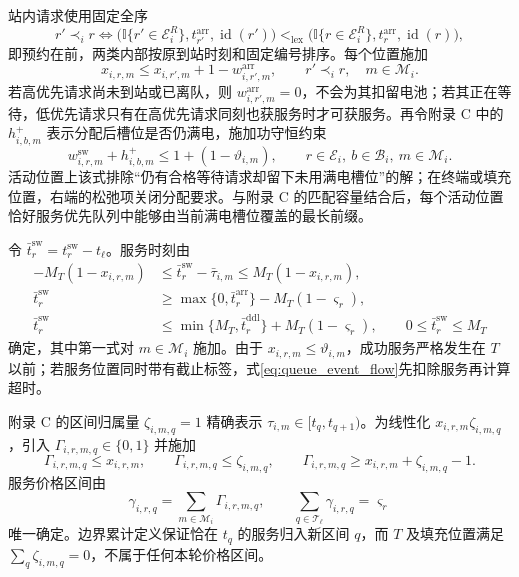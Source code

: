 \documentclass[12pt,a4paper,UTF8]{ctexart}
\begin{document}
站内请求使用固定全序
\begin{equation}
r'\prec_i r
\Longleftrightarrow
\bigl(\mathbb I\{r'\in\mathcal E_i^R\},
t_{r'}^{\mathrm{arr}},\operatorname{id}(r')\bigr)
<_{\mathrm{lex}}
\bigl(\mathbb I\{r\in\mathcal E_i^R\},
t_r^{\mathrm{arr}},\operatorname{id}(r)\bigr),
\label{eq:reservation_priority}
\end{equation}
即预约在前，两类内部按原到站时刻和固定编号排序。每个位置施加
\begin{equation}
x_{i,r,m}
\le x_{i,r',m}+1-w_{i,r',m}^{\mathrm{arr}},
\qquad r'\prec_i r,\quad m\in\mathcal M_i.
\label{eq:reservation_service_order}
\end{equation}
若高优先请求尚未到站或已离队，则
$w_{i,r',m}^{\mathrm{arr}}=0$，不会为其扣留电池；若其正在等待，低优先请求只有在高优先请求同刻也获服务时才可获服务。再令附录 C 中的 $h_{i,b,m}^+$ 表示分配后槽位是否仍满电，施加功守恒约束
\begin{equation}
w_{i,r,m}^{\mathrm{sw}}+h_{i,b,m}^{+}
\le1+(1-\vartheta_{i,m}),
\qquad r\in\mathcal E_i,\ b\in\mathcal B_i,\ m\in\mathcal M_i.
\label{eq:work_conservation}
\end{equation}
活动位置上该式排除“仍有合格等待请求却留下未用满电槽位”的解；在终端或填充位置，右端的松弛项关闭分配要求。与附录 C 的匹配容量结合后，每个活动位置恰好服务优先队列中能够由当前满电槽位覆盖的最长前缀。

令 $\bar t_r^{\mathrm{sw}}=t_r^{\mathrm{sw}}-t_\ell$。服务时刻由
\begin{subequations}
\label{eq:service_window}
\begin{align}
-M_T(1-x_{i,r,m})
&\le \bar t_r^{\mathrm{sw}}-\bar\tau_{i,m}
\le M_T(1-x_{i,r,m}),\\
\bar t_r^{\mathrm{sw}}
&\ge \max\{0,\bar t_r^{\mathrm{arr}}\}
-M_T(1-\varsigma_r),\\
\bar t_r^{\mathrm{sw}}
&\le \min\{M_T,\bar t_r^{\mathrm{ddl}}\}
+M_T(1-\varsigma_r),\qquad
0\le\bar t_r^{\mathrm{sw}}\le M_T
\end{align}
\end{subequations}
确定，其中第一式对 $m\in\mathcal M_i$ 施加。由于 $x_{i,r,m}\le \vartheta_{i,m}$，成功服务严格发生在 $T$ 以前；若服务位置同时带有截止标签，式\eqref{eq:queue_event_flow}先扣除服务再计算超时。

附录 C 的区间归属量 $\zeta_{i,m,q}=1$ 精确表示
$\tau_{i,m}\in[t_q,t_{q+1})$。为线性化
$x_{i,r,m}\zeta_{i,m,q}$，引入
$\Gamma_{i,r,m,q}\in\{0,1\}$ 并施加
\[
\Gamma_{i,r,m,q}\le x_{i,r,m},\qquad
\Gamma_{i,r,m,q}\le\zeta_{i,m,q},\qquad
\Gamma_{i,r,m,q}\ge x_{i,r,m}+\zeta_{i,m,q}-1.
\]
服务价格区间由
\begin{equation}
\gamma_{i,r,q}
=\sum_{m\in\mathcal M_i}\Gamma_{i,r,m,q},
\qquad
\sum_{q\in\mathcal T_\ell}\gamma_{i,r,q}=\varsigma_r
\label{eq:service_price_bin}
\end{equation}
唯一确定。边界累计定义保证恰在 $t_q$ 的服务归入新区间 $q$，而 $T$ 及填充位置满足 $\sum_q\zeta_{i,m,q}=0$，不属于任何本轮价格区间。
\end{document}
